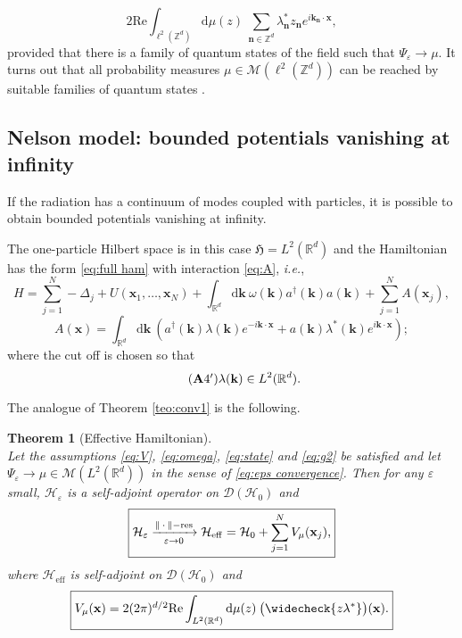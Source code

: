 \documentclass[11pt,a4paper,reqno]{amsart}
\renewcommand{\Re}{\mathrm{Re}}
\newtheorem{thm}{Theorem}[section]
\theoremstyle{definition}
\numberwithin{equation}{section}
\newcommand{\beq}{\begin{equation}}
\newcommand{\eeq}{\end{equation}}
\newcommand{\disp}{\displaystyle}
\newcommand{\lf}{\left}
\newcommand{\ri}{\right}
\newcommand{\xv}{\mathbf{x}}
\newcommand{\kv}{\mathbf{k}}
\newcommand{\nv}{\mathbf{n}}
\newcommand{\diff}{\mathrm{d}}
\newcommand{\eps}{\varepsilon}
\newcommand{\R}{\mathbb{R}}
\newcommand{\M}{\mathscr{M}}
\newcommand{\dom}{\mathscr{D}}
\newcommand{\HH}{\mathcal{H}}
\newcommand{\HHe}{\mathcal{H}_{\mathrm{eff}}}
\newcommand{\hh}{\mathfrak{H}}
\begin{document}
\begin{equation}
  	\label{eq:24}
  	2\Re \int_{\ell^2(\mathbb{Z}^d)}^{} \mathrm{d}\mu(z) \: \sum_{\nv \in \mathbb{Z}^d}^{} \lambda^{*}_{\nv} z_{\nv} e^{i \kv_{\nv} \cdot \xv},
\end{equation}
provided that there is a family of quantum states of the field such that $\Psi_\varepsilon \to \mu$. It turns out that all probability
measures $\mu\in \mathcal{\M} \lf( \ell^2(\mathbb{Z}^d) \ri)$ can be reached by suitable families of quantum
states \cite{Falconi:2016ab}.


\subsection{Nelson model: bounded potentials vanishing at infinity}
\label{sec:nelson}

If the radiation has a continuum of modes coupled with particles, it is possible to obtain bounded potentials
vanishing at infinity. 

The one-particle Hilbert space is in this case $ \hh = L^2(\R^d) $ and the Hamiltonian has the form \eqref{eq:full ham} with interaction \eqref{eq:A}, {\it i.e.},
\beq
	\label{eq:nelson ham}
	H=\disp\sum_{j=1}^N -\Delta_j +U(\xv_1,\ldots,\xv_N)+ \int_{\R^d} \diff \kv \: \omega(\kv) a^{\dagger}(\kv) a(\kv) + \sum_{j=1}^N A(\xv_j),
\eeq
\beq
	\label{eq:nelson interaction}
 	A(\xv) = \int_{\R^d}^{} \diff \kv \: \lf( a^{\dagger}(\kv) \lambda(\kv) e^{-i \kv\cdot \xv} + a(\kv) \lambda^*(\kv) e^{i \kv\cdot \xv}\ri);
\eeq
where the cut off is chosen so that
\beq	
	\label{eq:g2} \tag{{\bf A}4${}^{\prime}$}
	\lambda(\kv) \in L^2(\R^d).
\eeq

The analogue of Theorem \ref{teo:conv1} is the following.

	\begin{thm}[Effective Hamiltonian]
  		\label{teo:conv2}
  		\mbox{}	\\
  		Let the assumptions \eqref{eq:V}, \eqref{eq:omega}, \eqref{eq:state} and \eqref{eq:g2} be satisfied and let $ \Psi_{\eps}\to  \mu \in \M(L^2(\R^d)) $ in the sense of \eqref{eq:eps convergence}. Then for any $ \eps $ small, $ \HH_{\eps} $ is a self-adjoint operator on $ \dom(\HH_0) $ and 
		\beq
			\label{eq:conv2}
			\framebox{$ \HH_{\eps} \xrightarrow[\eps \to 0]{\lf\| \: \cdot \: \ri\|-\mathrm{res}} \HHe = \HH_0 + \disp\sum_{j = 1}^N V_{\mu}(\xv_j)$,}
		\eeq
		where $ \HHe $ is self-adjoint on  $ \dom(\HH_0) $ and
		 \begin{equation}
		 	\label{eq:V2}
 	  	 	\framebox{$ V_{\mu}(\xv) = 2 (2\pi)^{d/2} \Re\disp\int_{L^2(\mathbb{R}^d)}^{}\mathrm{d}\mu(z) \: \big( \widecheck{z \lambda^{*}} \big)(\xv). $}
            \end{equation}
  	\end{thm}
  	
\end{document}
